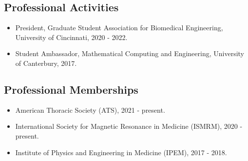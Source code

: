 \documentclass[12pt,]{scrartcl}
\begin{document}


\subsection{Professional Activities}\label{professional-activities}

\begin{itemize}
  \leftskip-0.25in
  \item President, Graduate Student Association for Biomedical Engineering, University of Cincinnati, 2020 - 2022.
  \item Student Ambassador, Mathematical Computing and Engineering, University of Canterbury, 2017.

\end{itemize}

\subsection{Professional Memberships}\label{professional-memberships}

\begin{itemize}
  \leftskip-0.25in
  \item American Thoracic Society (ATS), 2021 - present.
  \item International Society for Magnetic Resonance in Medicine (ISMRM), 2020 - present.
  \item Institute of Physics and Engineering in Medicine (IPEM), 2017 - 2018.
\end{itemize}
\end{document}
